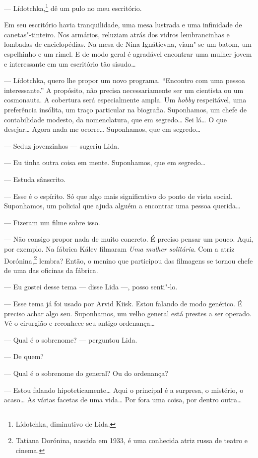 --- Lídotchka,\footnote{Lídotchka, diminutivo de Lida.} dê um pulo no
meu escritório.

Em seu escritório havia tranquilidade, uma mesa lustrada e uma
infinidade de canetas"-tinteiro. Nos armários, reluziam atrás dos vidros
lembrancinhas e lombadas de enciclopédias. Na mesa de Nina Ignátievna,
viam"-se um batom, um espelhinho e um rímel. E de modo geral é agradável
encontrar uma mulher jovem e interessante em um escritório tão sisudo\ldots{}

--- Lídotchka, quero lhe propor um novo programa. ``Encontro com uma
pessoa interessante.'' A propósito, não precisa necessariamente ser um
cientista ou um cosmonauta. A cobertura será especialmente ampla. Um
\emph{hobby} respeitável, uma preferência insólita, um traço particular
na biografia. Suponhamos, um chefe de contabilidade modesto, da
nomenclatura, que em segredo\ldots{} Sei lá\ldots{} O que desejar\ldots{} Agora nada me
ocorre\ldots{} Suponhamos, que em segredo\ldots{}

--- Seduz jovenzinhos --- sugeriu Lida.

--- Eu tinha outra coisa em mente. Suponhamos, que em segredo\ldots{}

--- Estuda sânscrito.

--- Esse é o espírito. Só que algo mais significativo do ponto de vista
social. Suponhamos, um policial que ajuda alguém a encontrar uma pessoa
querida\ldots{}

--- Fizeram um filme sobre isso.

--- Não consigo propor nada de muito concreto. É preciso pensar um
pouco. Aqui, por exemplo. Na fábrica Kálev filmaram \emph{Uma mulher
solitária}. Com a atriz Dorónina,\footnote{Tatiana Dorónina, nascida em
  1933, é uma conhecida atriz russa de teatro e cinema.} lembra? Então,
o menino que participou das filmagens se tornou chefe de uma das oficinas
da fábrica.

--- Eu gostei desse tema --- disse Lida ---, posso senti"-lo.

--- Esse tema já foi usado por Arvid Kiisk. Estou falando de modo
genérico. É preciso achar algo seu. Suponhamos, um velho general está
prestes a ser operado. Vê o cirurgião e reconhece seu antigo
ordenança\ldots{}

--- Qual é o sobrenome? --- perguntou Lida.

--- De quem?

--- Qual é o sobrenome do general? Ou do ordenança?

--- Estou falando hipoteticamente\ldots{} Aqui o principal é a surpresa, o
mistério, o acaso\ldots{} As várias facetas de uma vida\ldots{} Por fora uma
coisa, por dentro outra\ldots{}

